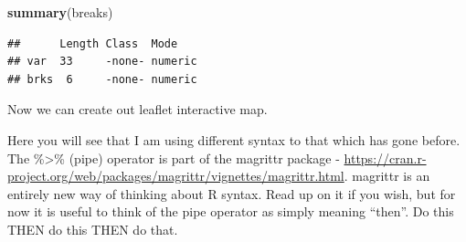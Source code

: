 \documentclass[]{book}
\newenvironment{Shaded}{\begin{snugshade}}{\end{snugshade}}
\newcommand{\KeywordTok}[1]{\textcolor[rgb]{0.13,0.29,0.53}{\textbf{#1}}}
\newcommand{\NormalTok}[1]{#1}
\newcommand{\OperatorTok}[1]{\textcolor[rgb]{0.81,0.36,0.00}{\textbf{#1}}}
\newcommand{\StringTok}[1]{\textcolor[rgb]{0.31,0.60,0.02}{#1}}
\begin{document}
\begin{Shaded}
\begin{Highlighting}[]
\KeywordTok{summary}\NormalTok{(breaks)}
\end{Highlighting}
\end{Shaded}

\begin{verbatim}
##      Length Class  Mode   
## var  33     -none- numeric
## brks  6     -none- numeric
\end{verbatim}

\begin{Shaded}
\end{Shaded}

Now we can create out leaflet interactive map.

Here you will see that I am using different syntax to that which has gone before. The \%\textgreater{}\% (pipe) operator is part of the magrittr package - \url{https://cran.r-project.org/web/packages/magrittr/vignettes/magrittr.html}. magrittr is an entirely new way of thinking about R syntax. Read up on it if you wish, but for now it is useful to think of the pipe operator as simply meaning ``then''. Do this THEN do this THEN do that.
\end{document}
